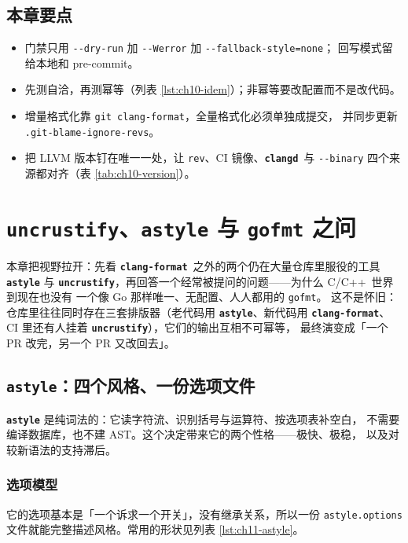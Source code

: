 \documentclass[12pt,a4paper,fontset=fandol]{ctexbook}
\newcommand{\Opt}[1]{\texttt{-\/-#1}}
\newcommand{\Bk}{\discretionary{}{}{}}
\newcommand{\Lib}[1]{\textbf{\texttt{#1}}}
\newcommand{\Lang}[1]{\textsf{#1}}
\newcommand{\CL}{\Lang{C}}
\newcommand{\CPP}{\Lang{C++}}
\newcommand{\Fmt}{\Lib{clang-format}}
\newcommand{\CD}{\Lib{clangd}}
\begin{document}
\section*{本章要点}
\begin{itemize}
  \item 门禁只用 \Opt{dry-run} 加 \Opt{Werror} 加 \Opt{fallback-style=none}；
    回写模式留给本地和 pre-commit。
  \item 先测自洽，再测幂等（列表 \ref{lst:ch10-idem}）；非幂等要改配置而不是改代码。
  \item 增量格式化靠 \texttt{git clang-{\Bk}format}，全量格式化必须单独成提交，
    并同步更新 \texttt{.git-{\Bk}blame-{\Bk}ignore-{\Bk}revs}。
  \item 把 LLVM 版本钉在唯一一处，让 \texttt{rev}、CI 镜像、\CD\ 与
    \Opt{binary} 四个来源都对齐（表 \ref{tab:ch10-version}）。
\end{itemize}

\chapter{\Lib{uncrustify}、\Lib{astyle} 与 \texttt{gofmt} 之问}\label{ch:other-formatters}

本章把视野拉开：先看 \Fmt\ 之外的两个仍在大量仓库里服役的工具 \Lib{astyle} 与
\Lib{uncrustify}，再回答一个经常被提问的问题——为什么 \CL/{\Bk}\CPP\ 世界到现在也没有
一个像 Go 那样唯一、无配置、人人都用的 \texttt{gofmt}。
这不是怀旧：仓库里往往同时存在三套排版器（老代码用 \Lib{astyle}、新代码用 \Fmt、
CI 里还有人挂着 \Lib{uncrustify}），它们的输出互相不可幂等，
最终演变成「一个 PR 改完，另一个 PR 又改回去」。

\section{\Lib{astyle}：四个风格、一份选项文件}\label{sec:ch11-s1}

\Lib{astyle} 是纯词法的：它读字符流、识别括号与运算符、按选项表补空白，
不需要编译数据库，也不建 AST。这个决定带来它的两个性格——极快、极稳，
以及对较新语法的支持滞后。

\subsection{选项模型}\label{sec:ch11-s1-model}

它的选项基本是「一个诉求一个开关」，没有继承关系，所以一份 \texttt{astyle.options}
文件就能完整描述风格。常用的形状见列表 \ref{lst:ch11-astyle}。
\end{document}

